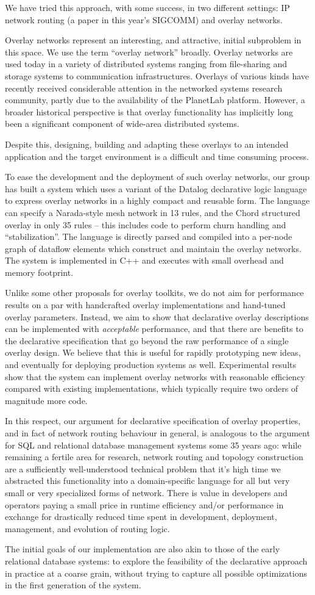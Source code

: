 \documentclass[10pt,twocolumn]{article}
\begin{document}
We have tried this approach, with some success, in two different
settings: IP network routing (a paper in this year's SIGCOMM) and
overlay networks.  

Overlay networks represent an interesting, and attractive, initial
subproblem in this space.  We use the term ``overlay network''
broadly. 
Overlay networks are used today in a variety of distributed systems
ranging from file-sharing and storage systems to communication
infrastructures.  Overlays of various kinds have recently received
considerable attention in the networked systems research community,
partly due to the availability of the PlanetLab platform.  However, a
broader historical perspective is 
that overlay functionality has implicitly long been a significant
component of wide-area distributed systems.

Despite this, designing, building and adapting these overlays to an
intended application and the target environment is a difficult and
time consuming process.

To ease the development and the deployment of such overlay networks,
our group has built a system which uses a variant of the Datalog
declarative logic language to express overlay networks in a highly
compact and reusable form.  The language can specify a Narada-style
mesh network in 13 rules, and the Chord structured overlay in only 35
rules -- this includes code to perform churn handling and
``stabilization''.   The language is directly parsed and compiled into
a per-node graph of dataflow elements which construct and maintain the
overlay networks.   The system is implemented in C++ and executes with
small overhead and memory footprint.  

Unlike some other proposals for overlay toolkits, we do not aim
for performance results on a par with handcrafted overlay
implementations and hand-tuned overlay parameters.  Instead, we
aim to show that declarative overlay descriptions can be implemented
with \emph{acceptable} performance, and that there are
benefits to the declarative specification that go beyond the raw
performance of a single overlay design.  We believe that this is
useful for rapidly prototyping new ideas, and eventually for deploying
production systems as well.  Experimental results show that
the system can implement overlay networks with reasonable efficiency
compared with existing implementations, which typically require two
orders of magnitude more code. 

In this respect, our argument for declarative specification of overlay
properties, and in fact of network routing behaviour in general, is
analogous to the argument for SQL and relational database management
systems some 35 years ago: while remaining a fertile area for
research, network routing and topology construction are a sufficiently
well-understood technical problem that it's high time we abstracted
this functionality into a domain-specific language for all but very
small or very specialized forms of network.  There is value in
developers and operators paying a small price in runtime efficiency
and/or performance in exchange for drastically reduced time spent in
development, deployment, management, and evolution of routing logic.

The initial goals of our implementation are also akin to those of the
early relational database systems: to explore the feasibility of the
declarative approach in practice at a coarse grain, without trying to
capture all possible optimizations in the first generation of the
system.
\end{document}
